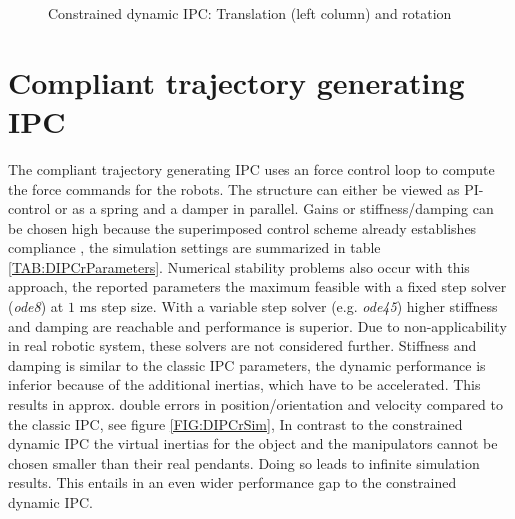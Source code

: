 \documentclass[a4paper,twoside, openright,12pt]{report}
\begin{document}
\begin{figure}

\label{FIG:DIPCcSim}
\caption[Simulation results of the constrained dynamic IPC]{Constrained dynamic IPC: Translation (left column) and rotation}
\end{figure}

\section{Compliant trajectory generating IPC}
The compliant trajectory generating IPC uses an force control loop to compute the force commands for the robots. The structure can either be viewed as PI-control or as a spring and a damper in parallel. Gains or stiffness/damping can be chosen high because the superimposed control scheme already establishes compliance \cite{Caccavale_08}, the simulation settings are summarized in table \ref{TAB:DIPCrParameters}. Numerical stability problems also occur with this approach, the reported parameters   the maximum feasible with a fixed step solver (\emph{ode8}) at $1$ ms step size. With a variable step solver (e.g. \emph{ode45}) higher stiffness and damping are reachable and performance is superior. Due to non-applicability in real robotic system, these solvers are not considered further. Stiffness and damping is similar to the classic IPC parameters, the dynamic performance is inferior because of the additional inertias, which have to be accelerated. This results in approx. double errors in position/orientation and velocity compared to the classic IPC, see figure \ref{FIG:DIPCrSim}, In contrast to the constrained dynamic IPC the virtual inertias for the object and the manipulators cannot be chosen smaller than their real pendants. Doing so leads to infinite simulation results. This entails in an even wider performance gap to the constrained dynamic IPC.
\end{document}
